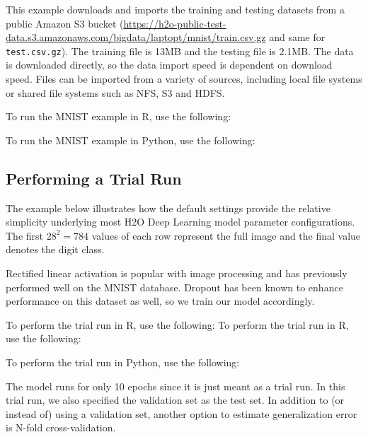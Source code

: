 {{This example downloads and imports the training and testing datasets from a public Amazon S3 bucket (\url{https://h2o-public-test-data.s3.amazonaws.com/bigdata/laptopt/mnist/train.csv.gz} and same for \texttt{test.csv.gz}).
The training file is 13MB and the testing file is 2.1MB. The data is downloaded directly, so the data import speed is dependent on download speed.  Files can be imported from a variety of sources, including local file systems or shared file systems such as NFS, S3 and HDFS.

\newpage
\waterExampleInR
To run the MNIST example in R, use the following: 


\waterExampleInPython
To run the MNIST example in Python, use the following: 


\newpage
\subsection{Performing a Trial Run}
\label{ssec:TrialRun} 

The example below illustrates how the default settings provide the relative simplicity underlying most H2O Deep Learning model parameter configurations. The first $28^2 = 784$ values of each row represent the full image and the final value denotes the digit class. 

Rectified linear activation is popular with image processing and has previously performed well on the MNIST database. Dropout has been known to enhance performance on this dataset as well, so we train our model accordingly. 

\waterExampleInR
To perform the trial run in R, use the following: 
To perform the trial run in R, use the following:


\newpage
\waterExampleInPython
To perform the trial run in Python, use the following: 


\noindent
The model runs for only 10 epochs since it is just meant as a trial run. In this trial run, we also specified the validation set as the test set.  In addition to (or instead of) using a validation set, another option to estimate generalization error is N-fold cross-validation.

}}
